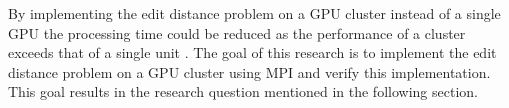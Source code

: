 By implementing the edit distance problem on a GPU cluster instead of a single GPU the processing time could be reduced as the performance of a cluster exceeds that of a single unit \cite{Cluster}.
The goal of this research is to implement the edit distance problem on a GPU cluster using MPI and verify this implementation.
This goal results in the research question mentioned in the following section.

